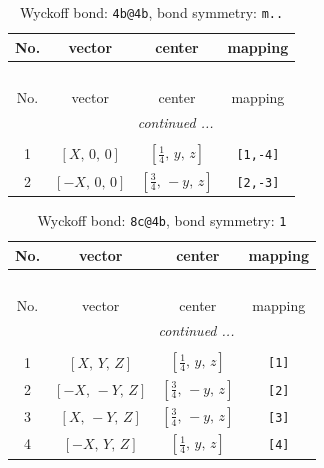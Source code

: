 \documentclass[fleqn,8pt]{jsarticle}
\begin{document}
\renewcommand{\arraystretch}{1.2}
\begin{longtable}{cccc}
\caption{Wyckoff bond: {\tt 4b@4b}, bond symmetry: {\tt m..}}
 \\
 \hline \hline
No. & vector & center & mapping \\ \hline \endfirsthead

\multicolumn{3}{l}{\tablename\ \thetable{}} \\
 \hline \hline
No. & vector & center & mapping \\ \hline \endhead

 \hline \hline
\multicolumn{3}{r}{\footnotesize\it continued ...} \\ \endfoot

 \hline \hline
\multicolumn{3}{r}{} \\ \endlastfoot

1 & $\left[ X,\, 0,\, 0 \right]$ & $\left[ \frac{1}{4},\, y,\, z \right]$ & {\tt [1,-4]} \\ \hline
2 & $\left[ - X,\, 0,\, 0 \right]$ & $\left[ \frac{3}{4},\, - y,\, z \right]$ & {\tt [2,-3]} \\
\end{longtable}
\renewcommand{\arraystretch}{1.2}
\begin{longtable}{cccc}
\caption{Wyckoff bond: {\tt 8c@4b}, bond symmetry: {\tt 1}}
 \\
 \hline \hline
No. & vector & center & mapping \\ \hline \endfirsthead

\multicolumn{3}{l}{\tablename\ \thetable{}} \\
 \hline \hline
No. & vector & center & mapping \\ \hline \endhead

 \hline \hline
\multicolumn{3}{r}{\footnotesize\it continued ...} \\ \endfoot

 \hline \hline
\multicolumn{3}{r}{} \\ \endlastfoot

1 & $\left[ X,\, Y,\, Z \right]$ & $\left[ \frac{1}{4},\, y,\, z \right]$ & {\tt [1]} \\ \hline
2 & $\left[ - X,\, - Y,\, Z \right]$ & $\left[ \frac{3}{4},\, - y,\, z \right]$ & {\tt [2]} \\ \hline
3 & $\left[ X,\, - Y,\, Z \right]$ & $\left[ \frac{3}{4},\, - y,\, z \right]$ & {\tt [3]} \\ \hline
4 & $\left[ - X,\, Y,\, Z \right]$ & $\left[ \frac{1}{4},\, y,\, z \right]$ & {\tt [4]} \\
\end{longtable}
\end{document}
